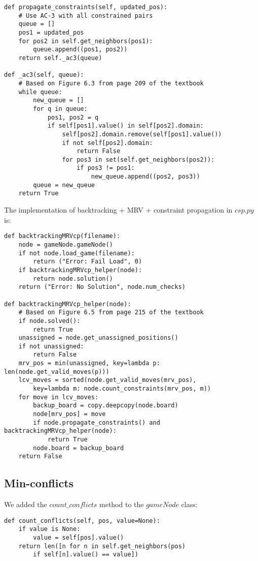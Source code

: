\documentclass[11pt]{article}
\begin{document}
\lstset{language=Python}
\begin{lstlisting}[frame=single]
def propagate_constraints(self, updated_pos):
	# Use AC-3 with all constrained pairs
	queue = []
	pos1 = updated_pos
	for pos2 in self.get_neighbors(pos1):
		queue.append((pos1, pos2))
	return self._ac3(queue)
	
def _ac3(self, queue):
	# Based on Figure 6.3 from page 209 of the textbook
	while queue:
		new_queue = []
		for q in queue:
			pos1, pos2 = q
			if self[pos1].value() in self[pos2].domain:
				self[pos2].domain.remove(self[pos1].value())
				if not self[pos2].domain:
					return False
				for pos3 in set(self.get_neighbors(pos2)):
					if pos3 != pos1:
						new_queue.append((pos2, pos3))
		queue = new_queue
	return True
\end{lstlisting}

The implementation of backtracking + MRV + constraint propagation in $csp.py$ is:

\lstset{language=Python}
\begin{lstlisting}[frame=single]
def backtrackingMRVcp(filename):
	node = gameNode.gameNode()
	if not node.load_game(filename):
		return ("Error: Fail Load", 0)
	if backtrackingMRVcp_helper(node):
		return node.solution()
	return ("Error: No Solution", node.num_checks)

def backtrackingMRVcp_helper(node):
	# Based on Figure 6.5 from page 215 of the textbook
	if node.solved():
		return True
	unassigned = node.get_unassigned_positions()
	if not unassigned:
		return False
	mrv_pos = min(unassigned, key=lambda p: len(node.get_valid_moves(p)))
	lcv_moves = sorted(node.get_valid_moves(mrv_pos),
		key=lambda m: node.count_constraints(mrv_pos, m))
	for move in lcv_moves:
		backup_board = copy.deepcopy(node.board)
		node[mrv_pos] = move
		if node.propagate_constraints() and backtrackingMRVcp_helper(node):
			return True
		node.board = backup_board
	return False
\end{lstlisting}

\subsection{Min-conflicts}

We added the $count\_conflicts$ method to the $gameNode$ class:

\lstset{language=Python}
\begin{lstlisting}[frame=single]
def count_conflicts(self, pos, value=None):
	if value is None:
		value = self[pos].value()
	return len([n for n in self.get_neighbors(pos)
		if self[n].value() == value])
\end{lstlisting}
\end{document}
